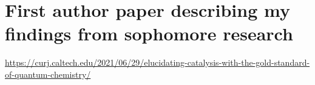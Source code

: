 \documentclass{article}
\begin{document}
\section{First author paper describing my findings from sophomore research}
\url{https://curj.caltech.edu/2021/06/29/elucidating-catalysis-with-the-gold-standard-of-quantum-chemistry/}
\end{document}
